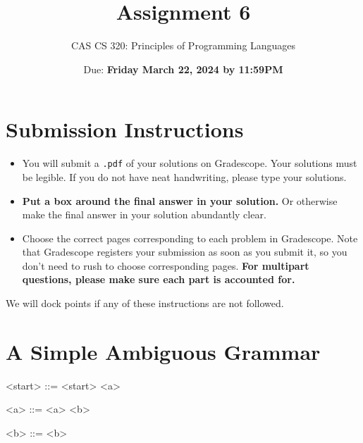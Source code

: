 \documentclass{article}
\title{
Assignment 6
}
\author{CAS CS 320: Principles of Programming Languages}
\date{Due: \textbf{Friday March 22, 2024 by 11:59PM}}
\theoremstyle{remark} \newtheorem*{solution}{Solution}
\begin{document}
\maketitle
\section*{Submission Instructions}
\begin{itemize}
\item
You will submit a \texttt{.pdf} of your solutions on Gradescope.  Your
solutions must be legible. If you do not have neat handwriting, please
type your solutions.
\item
\textbf{Put a box around the final answer in your solution.}  Or
otherwise make the final answer in your solution abundantly clear.
\item
Choose the correct pages corresponding to each problem in Gradescope.
Note that Gradescope registers your submission as soon as you submit
it, so you don’t need to rush to choose corresponding pages.
\textbf{For multipart questions, please make sure each part is
  accounted for.}
\end{itemize}
We will dock points if any of these instructions are not followed.

\pagebreak
\section{A Simple Ambiguous Grammar}

\begin{mdframed}
\begin{grammar}
<start> ::=  <start> 
\alt <a>

<a> ::=  <a>
\alt {} <b>

<b> ::=   <b>
\alt {} 

\end{grammar}
\end{mdframed}
\end{document}
